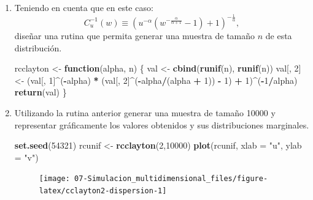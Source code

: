\documentclass[
]{book}
\newenvironment{Shaded}{\begin{snugshade}}{\end{snugshade}}
\newcommand{\ControlFlowTok}[1]{\textcolor[rgb]{0.13,0.29,0.53}{\textbf{#1}}}
\newcommand{\DataTypeTok}[1]{\textcolor[rgb]{0.13,0.29,0.53}{#1}}
\newcommand{\DecValTok}[1]{\textcolor[rgb]{0.00,0.00,0.81}{#1}}
\newcommand{\KeywordTok}[1]{\textcolor[rgb]{0.13,0.29,0.53}{\textbf{#1}}}
\newcommand{\NormalTok}[1]{#1}
\newcommand{\OperatorTok}[1]{\textcolor[rgb]{0.81,0.36,0.00}{\textbf{#1}}}
\newcommand{\StringTok}[1]{\textcolor[rgb]{0.31,0.60,0.02}{#1}}
\theoremstyle{break}
\theoremstyle{definition}
\theoremstyle{definition}
\theoremstyle{definition}
\theoremstyle{remark}
\begin{document}
\begin{enumerate}
\def\labelenumi{\alph{enumi})}
\item
  Teniendo en cuenta que en este caso:
  \[C_{u}^{-1}(w)\equiv\left(  u^{-\alpha}\left(  
  w^{-\frac{\alpha}{\alpha+1}}-1\right) + 1 \right)^{-\frac{1}{\alpha}},\]
  diseñar una rutina que permita generar una muestra de tamaño \(n\)
  de esta distribución.

\begin{Shaded}
\begin{Highlighting}[]
\NormalTok{rcclayton <-}\StringTok{ }\ControlFlowTok{function}\NormalTok{(alpha, n) \{}
\NormalTok{  val <-}\StringTok{ }\KeywordTok{cbind}\NormalTok{(}\KeywordTok{runif}\NormalTok{(n), }\KeywordTok{runif}\NormalTok{(n))}
\NormalTok{  val[, }\DecValTok{2}\NormalTok{] <-}\StringTok{ }\NormalTok{(val[, }\DecValTok{1}\NormalTok{]}\OperatorTok{^}\NormalTok{(}\OperatorTok{-}\NormalTok{alpha) }\OperatorTok{*}\StringTok{ }
\StringTok{              }\NormalTok{(val[, }\DecValTok{2}\NormalTok{]}\OperatorTok{^}\NormalTok{(}\OperatorTok{-}\NormalTok{alpha}\OperatorTok{/}\NormalTok{(alpha }\OperatorTok{+}\StringTok{ }\DecValTok{1}\NormalTok{)) }\OperatorTok{-}\StringTok{ }\DecValTok{1}\NormalTok{) }\OperatorTok{+}\StringTok{ }\DecValTok{1}\NormalTok{)}\OperatorTok{^}\NormalTok{(}\OperatorTok{-}\DecValTok{1}\OperatorTok{/}\NormalTok{alpha)}
  \KeywordTok{return}\NormalTok{(val)}
\NormalTok{\}}
\end{Highlighting}
\end{Shaded}
\item
  Utilizando la rutina anterior generar una muestra de tamaño
  10000 y representar gráficamente los valores obtenidos y sus
  distribuciones marginales.

\begin{Shaded}
\begin{Highlighting}[]
\KeywordTok{set.seed}\NormalTok{(}\DecValTok{54321}\NormalTok{)}
\NormalTok{rcunif <-}\StringTok{ }\KeywordTok{rcclayton}\NormalTok{(}\DecValTok{2}\NormalTok{,}\DecValTok{10000}\NormalTok{)}
\KeywordTok{plot}\NormalTok{(rcunif, }\DataTypeTok{xlab =} \StringTok{"u"}\NormalTok{, }\DataTypeTok{ylab =} \StringTok{"v"}\NormalTok{)}
\end{Highlighting}
\end{Shaded}

  \begin{figure}[!htb]

  {\centering \texttt{[image: 07-Simulacion\_multidimensional\_files/figure-latex/cclayton2-dispersion-1]} 

}
\end{figure}
\end{enumerate}
\end{document}
